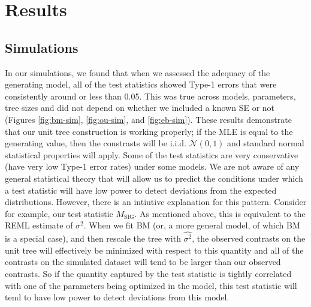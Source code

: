 \section{Results}

\subsection{Simulations}

In our simulations, we found that when we assessed the adequacy of the generating model, all of the test statistics showed Type-1 errors that were consistently around or less than 0.05. This was true across models, parameters, tree sizes and did not depend on whether we included a known SE or not (Figures \ref{fig:bm-sim}, \ref{fig:ou-sim}, and \ref{fig:eb-sim}). These results demonstrate that our unit tree construction is working properly; if the MLE is equal to the generating value, then the constrasts will be i.i.d. $\mathcal{N}(\text{0},\text{1})$ and standard normal statistical properties will apply. Some of the test statistics are very conservative (have very low Type-1 error rates) under some models. We are not aware of any general statistical theory that will allow us to predict the conditions under which a test statistic will have low power to detect deviations from the expected distributions. However, there is an intiutive explanation for this pattern. Consider for example, our test statistic $M_{\text{SIG}}$. As mentioned above, this is equivalent to the REML estimate of $\sigma^2$. When we fit BM (or, a more general model, of which BM is a special case), and then rescale the tree with $\hat{\sigma^2}$, the observed contrasts on the unit tree will effectively be minimized with respect to this quantity and all of the contrasts on the simulated dataset will tend to be larger than our observed contrasts. So if the quantity captured by the test statistic is tightly correlated with one of the parameters being optimized in the model, this test statistic will tend to have low power to detect deviations from this model.

